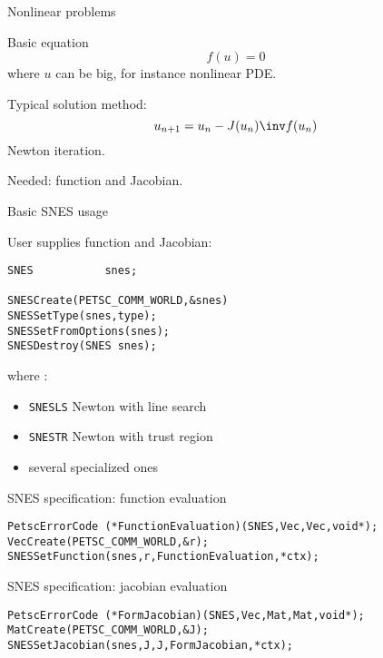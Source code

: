 

\begin{numberedframe}{Nonlinear problems}

Basic equation
\[ f(u) = 0 \]
where $u$ can be big, for instance nonlinear PDE.

Typical solution method:
\[ u_{n+1} = u_n- J(u_n)\inv f(u_n) \]
Newton iteration.

Needed: function and Jacobian.
\end{numberedframe}

\begin{numberedframe}{Basic SNES usage}

User supplies function and Jacobian:
\begin{verbatim}
SNES           snes;

SNESCreate(PETSC_COMM_WORLD,&snes)
SNESSetType(snes,type);
SNESSetFromOptions(snes);
SNESDestroy(SNES snes);
\end{verbatim}

where : 
\begin{itemize}
\item \lstinline{SNESLS} Newton with line search
\item \lstinline{SNESTR} Newton with trust region
\item several specialized ones
\end{itemize}
\end{numberedframe}

\begin{numberedframe}{SNES specification: function evaluation}
\begin{lstlisting}
PetscErrorCode (*FunctionEvaluation)(SNES,Vec,Vec,void*);
VecCreate(PETSC_COMM_WORLD,&r);
SNESSetFunction(snes,r,FunctionEvaluation,*ctx);
\end{lstlisting}
\end{numberedframe}

\begin{numberedframe}{SNES specification: jacobian evaluation}
\begin{lstlisting}
PetscErrorCode (*FormJacobian)(SNES,Vec,Mat,Mat,void*);
MatCreate(PETSC_COMM_WORLD,&J);
SNESSetJacobian(snes,J,J,FormJacobian,*ctx);
\end{lstlisting}
\end{numberedframe}

